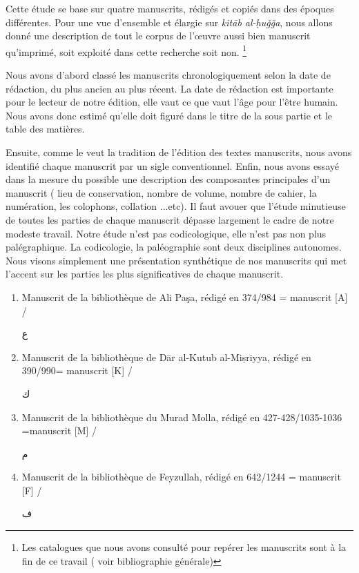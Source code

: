 \documentclass[a4paper,12pt]{report}
\begin{document}
\begin{itemize}
Cette étude se base sur quatre manuscrits, rédigés et copiés dans des époques différentes. Pour une vue d'ensemble et élargie sur\textit{ kitāb al-ḥuǧǧa}, nous allons  donné une  description de tout le corpus de l'œuvre  aussi bien manuscrit qu'imprimé,  soit exploité dans cette recherche soit non. \footnote{ Les catalogues que nous avons consulté pour repérer les manuscrits sont à la fin de ce travail ( voir bibliographie générale)}

Nous avons d'abord classé les manuscrits chronologiquement selon la date de rédaction, du plus ancien au plus récent. La date de rédaction est importante pour le lecteur de notre édition, elle vaut ce que vaut l'âge pour l'être humain. Nous avons donc estimé qu'elle doit figuré dans le titre de la sous partie et le table des matières.

Ensuite, comme le veut la tradition de l'édition des textes manuscrits, nous avons identifié  chaque manuscrit par un sigle conventionnel. Enfin, nous avons essayé dans la mesure du possible une description des composantes principales d'un manuscrit ( lieu de conservation, nombre de volume, nombre de cahier, la numération, les colophons, collation ...etc). Il faut avouer que l'étude minutieuse de toutes les parties de chaque manuscrit dépasse largement le cadre de notre modeste travail.  Notre étude n'est pas codicologique, elle n'est pas non plus palégraphique. La codicologie, la paléographie sont deux disciplines autonomes. Nous visons simplement une présentation synthétique de nos manuscrits qui met l'accent sur les parties les plus significatives de chaque manuscrit.   


\begin{enumerate}
    \item 
Manuscrit de la bibliothèque de  Ali Paşa, rédigé en 374/984 = manuscrit [A] /
\begin{Arabic}
 \large ع 
\end{Arabic}
  \item Manuscrit de la bibliothèque de Dār al-Kutub al-Miṣriyya, rédigé en 390/990= manuscrit [K] /
\begin{Arabic}
 \large ك 
\end{Arabic}

  \item Manuscrit de la bibliothèque du Murad Molla, rédigé en 427-428/1035-1036 =manuscrit [M] /
\begin{Arabic} 
\large
م 
\end{Arabic}
  \item  Manuscrit de la bibliothèque de Feyzullah,
rédigé en 642/1244 = manuscrit [F] / 
\begin{Arabic}
\large
 ف
\end{Arabic}


\end{enumerate}
\end{itemize}
\end{document}
